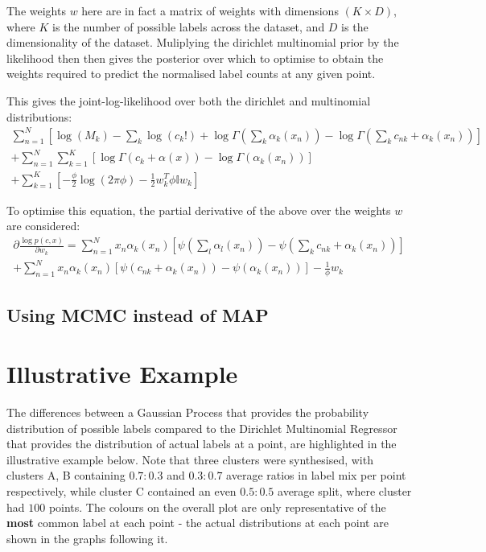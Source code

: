 The weights $w$ here are in fact a matrix of weights with dimensions $(K \times D)$, where $K$ is the number of possible labels across the dataset, and $D$ is the dimensionality of the dataset. Muliplying the dirichlet multinomial prior by the likelihood then then gives the posterior over which to optimise to obtain the weights required to predict the normalised label counts at any given point.

This gives the joint-log-likelihood over both the dirichlet and multinomial distributions:
\begin{multline}
    \sum^N_{n=1} [\log(M_k) - \sum_k \log(c_k!) + \log \Gamma(\sum_k \alpha_k(x_n)) - \log \Gamma(\sum_k c_{nk} + \alpha_k(x_n))] \\
    + \sum^N_{n=1} \sum^K_{k=1} [\log \Gamma(c_k + \alpha(x)) - \log \Gamma(\alpha_k(x_n))] \\
    + \sum^K_{k=1} [-\frac{\phi}{2} \log(2\pi \phi) - \frac{1}{2}w_k^T \phi \mathbb{I} w_k]
\end{multline}

To optimise this equation, the partial derivative of the above over the weights $w$ are considered:
\begin{multline}
    \partial \frac{\log p(c, x)}{\partial w_k} = \sum_{n=1}^N x_n \alpha_k (x_n) [\psi(\sum_l \alpha_l(x_n)) - \psi(\sum_k c_{nk} + \alpha_k(x_n))] \\
    + \sum^N_{n=1} x_n \alpha_k (x_n) [\psi (c_{nk} + \alpha_k(x_n)) - \psi(\alpha_k(x_n))] - \frac{1}{\phi} w_k
\end{multline}


\subsection{Using MCMC instead of MAP}
\section{Illustrative Example}

The differences between a Gaussian Process that provides the probability distribution of possible labels compared to the Dirichlet Multinomial Regressor that provides the distribution of actual labels at a point, are highlighted in the illustrative example below. Note that three clusters were synthesised, with clusters A, B containing $0.7:0.3$ and $0.3:0.7$ average ratios in label mix per point respectively, while cluster C contained an even $0.5:0.5$ average split, where cluster had $100$ points. The colours on the overall plot are only representative of the \textbf{most} common label at each point - the actual distributions at each point are shown in the graphs following it.

